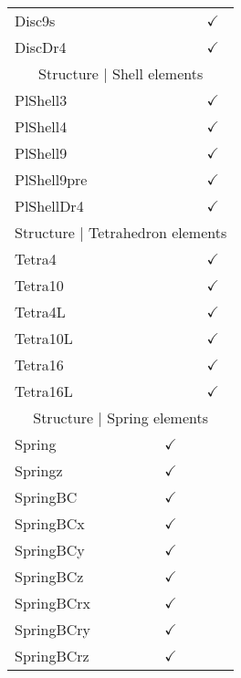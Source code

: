 \begin{longtable}{lcc}
        Disc9s              &               & $\checkmark$     \\
        DiscDr4             &               & $\checkmark$     \\ \hline
        \multicolumn{3}{c}{Structure | Shell elements}         \\ \hline
        PlShell3            &               & $\checkmark$     \\
        PlShell4            &               & $\checkmark$     \\
        PlShell9            &               & $\checkmark$     \\
        PlShell9pre         &               & $\checkmark$     \\
        PlShellDr4          &               & $\checkmark$     \\ \hline
        \multicolumn{3}{c}{Structure |   Tetrahedron elements} \\ \hline
        Tetra4              &               & $\checkmark$     \\
        Tetra10             &               & $\checkmark$     \\
        Tetra4L             &               & $\checkmark$     \\
        Tetra10L            &               & $\checkmark$     \\
        Tetra16             &               & $\checkmark$     \\
        Tetra16L            &               & $\checkmark$     \\ \hline
        \multicolumn{3}{c}{Structure | Spring elements}        \\ \hline
        Spring              & $\checkmark$  &                  \\
        Springz             & $\checkmark$  &                  \\ 
        SpringBC            & $\checkmark$  &                  \\ 
        SpringBCx            & $\checkmark$  &                  \\ 
        SpringBCy            & $\checkmark$  &                  \\ 
        SpringBCz            & $\checkmark$  &                  \\
        SpringBCrx            & $\checkmark$  &                  \\ 
        SpringBCry            & $\checkmark$  &                  \\ 
        SpringBCrz            & $\checkmark$  &                  \\ \hline

\end{longtable}
